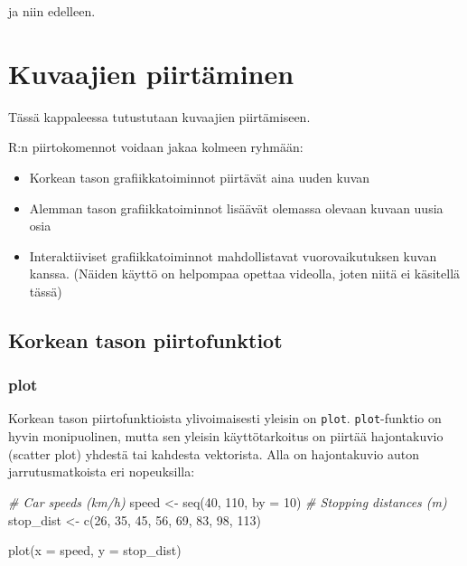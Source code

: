 \documentclass[
]{book}
\newenvironment{Shaded}{\begin{snugshade}}{\end{snugshade}}
\newcommand{\AttributeTok}[1]{\textcolor[rgb]{0.77,0.63,0.00}{#1}}
\newcommand{\CommentTok}[1]{\textcolor[rgb]{0.56,0.35,0.01}{\textit{#1}}}
\newcommand{\DecValTok}[1]{\textcolor[rgb]{0.00,0.00,0.81}{#1}}
\newcommand{\FunctionTok}[1]{\textcolor[rgb]{0.00,0.00,0.00}{#1}}
\newcommand{\NormalTok}[1]{#1}
\newcommand{\OtherTok}[1]{\textcolor[rgb]{0.56,0.35,0.01}{#1}}
\providecommand{\tightlist}{%
  \setlength{\itemsep}{0pt}\setlength{\parskip}{0pt}}
\begin{document}
ja niin edelleen.

\hypertarget{plotting}{%
\chapter{Kuvaajien piirtäminen}\label{plotting}}

Tässä kappaleessa tutustutaan kuvaajien piirtämiseen.

R:n piirtokomennot voidaan jakaa kolmeen ryhmään:

\begin{itemize}
\tightlist
\item
  Korkean tason grafiikkatoiminnot piirtävät aina uuden kuvan
\item
  Alemman tason grafiikkatoiminnot lisäävät olemassa olevaan kuvaan uusia osia
\item
  Interaktiiviset grafiikkatoiminnot mahdollistavat vuorovaikutuksen kuvan kanssa. (Näiden käyttö on helpompaa opettaa videolla, joten niitä ei käsitellä tässä)
\end{itemize}

\hypertarget{korkean-tason-piirtofunktiot}{%
\section{Korkean tason piirtofunktiot}\label{korkean-tason-piirtofunktiot}}

\hypertarget{plot}{%
\subsection{plot}\label{plot}}

Korkean tason piirtofunktioista ylivoimaisesti yleisin on \texttt{plot}. \texttt{plot}-funktio on hyvin monipuolinen, mutta sen yleisin käyttötarkoitus on piirtää hajontakuvio (scatter plot) yhdestä tai kahdesta vektorista. Alla on hajontakuvio auton jarrutusmatkoista eri nopeuksilla:

\begin{Shaded}
\begin{Highlighting}[]
\CommentTok{\# Car speeds (km/h)}
\NormalTok{speed }\OtherTok{\textless{}{-}} \FunctionTok{seq}\NormalTok{(}\DecValTok{40}\NormalTok{, }\DecValTok{110}\NormalTok{, }\AttributeTok{by =} \DecValTok{10}\NormalTok{)}
\CommentTok{\# Stopping distances (m)}
\NormalTok{stop\_dist }\OtherTok{\textless{}{-}} \FunctionTok{c}\NormalTok{(}\DecValTok{26}\NormalTok{, }\DecValTok{35}\NormalTok{, }\DecValTok{45}\NormalTok{, }\DecValTok{56}\NormalTok{, }\DecValTok{69}\NormalTok{, }\DecValTok{83}\NormalTok{, }\DecValTok{98}\NormalTok{, }\DecValTok{113}\NormalTok{)}

\FunctionTok{plot}\NormalTok{(}\AttributeTok{x =}\NormalTok{ speed, }\AttributeTok{y =}\NormalTok{ stop\_dist)}
\end{Highlighting}
\end{Shaded}
\end{document}
